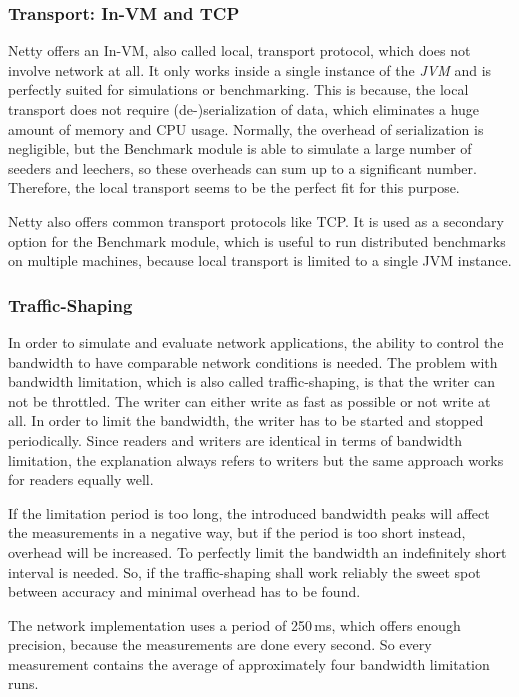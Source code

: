 \subsubsection{Transport: In-VM and TCP}
\label{module:core:net:transport}
Netty offers an In-VM, also called local, transport protocol, which does not involve network at all. It only works inside a single instance of the \emph{JVM} and is perfectly suited for simulations or benchmarking. This is because, the local transport does not require (de-)serialization of data, which eliminates a huge amount of memory and CPU usage. Normally, the overhead of serialization is negligible, but the Benchmark module is able to simulate a large number of seeders and leechers, so these overheads can sum up to a significant number. Therefore, the local transport seems to be the perfect fit for this purpose.

Netty also offers common transport protocols like TCP. It is used as a secondary option for the Benchmark module, which is useful to run distributed benchmarks on multiple machines, because local transport is limited to a single JVM instance.


\subsubsection{Traffic-Shaping}
\label{module:core:net:traffic}
In order to simulate and evaluate network applications, the ability to control the bandwidth to have comparable network conditions is needed. The problem with bandwidth limitation, which is also called traffic-shaping, is that the writer can not be throttled. The writer can either write as fast as possible or not write at all. In order to limit the bandwidth, the writer has to be started and stopped periodically. Since readers and writers are identical in terms of bandwidth limitation, the explanation always refers to writers but the same approach works for readers equally well.

If the limitation period is too long, the introduced bandwidth peaks will affect the measurements in a negative way, but if the period is too short instead, overhead will be increased. To perfectly limit the bandwidth an indefinitely short interval is needed. So, if the traffic-shaping shall work reliably the sweet spot between accuracy and minimal overhead has to be found. 

The network implementation uses a period of 250\,ms, which offers enough precision, because the measurements are done every second. So every measurement contains the average of approximately four bandwidth limitation runs.

